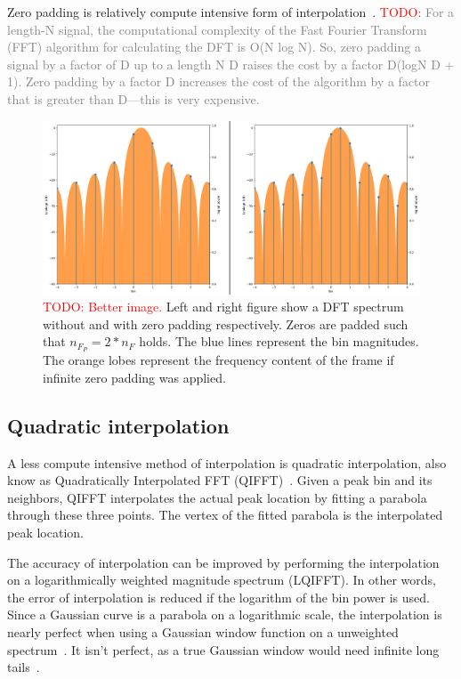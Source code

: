 \documentclass[a4paper,10pt,twocolumn]{article}
\begin{document}
Zero padding is relatively compute intensive form of interpolation~\cite{interpolnozero}. %
\textcolor{red}{TODO: }\textcolor{gray}{For a length-N signal, the computational complexity of the Fast Fourier Transform (FFT) algorithm for calculating the DFT is O(N log N). So, zero padding a signal by a factor of D up to a length N D raises the cost by a factor D(logN D + 1). Zero padding by a factor D increases the cost of the algorithm by a factor that is greater than D—this is very expensive.}
\begin{figure}[h]
    \centering
    \includegraphics[width=\linewidth]{fig/zero_pad_interpolate.png}
    \caption{\textcolor{red}{TODO: Better image.} Left and right figure show a DFT spectrum without and with zero padding respectively. Zeros are padded such that $n_{F_P} = 2 * n_F$ holds. The blue lines represent the bin magnitudes. The orange lobes represent the frequency content of the frame if infinite zero padding was applied.}
    \label{fig:visualpadding}
\end{figure}


\subsection{Quadratic interpolation}  \label{sub:qifft}
A less compute intensive method of interpolation is quadratic interpolation, also know as Quadratically Interpolated FFT (QIFFT)~\cite{interpolnozero}. Given a peak bin and its neighbors, QIFFT interpolates the actual peak location by fitting a parabola through these three points. The vertex of the fitted parabola is the interpolated peak location.

The accuracy of interpolation can be improved by performing the interpolation on a logarithmically weighted magnitude spectrum (LQIFFT). In other words, the error of interpolation is reduced if the logarithm of the bin power is used. Since a Gaussian curve is a parabola on a logarithmic scale, the interpolation is nearly perfect when using a Gaussian window function on a unweighted spectrum~\cite{interpolgaus}. It isn't perfect, as a true Gaussian window would need infinite long tails~\cite{gauswin}.
\end{document}
